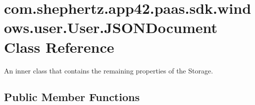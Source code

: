 \hypertarget{classcom_1_1shephertz_1_1app42_1_1paas_1_1sdk_1_1windows_1_1user_1_1_user_1_1_j_s_o_n_document}{\section{com.\+shephertz.\+app42.\+paas.\+sdk.\+windows.\+user.\+User.\+J\+S\+O\+N\+Document Class Reference}
\label{classcom_1_1shephertz_1_1app42_1_1paas_1_1sdk_1_1windows_1_1user_1_1_user_1_1_j_s_o_n_document}
}


An inner class that contains the remaining properties of the Storage.  


\subsection*{Public Member Functions}
